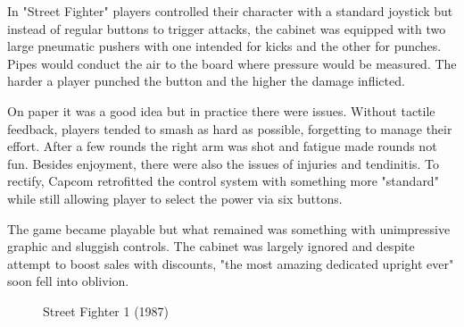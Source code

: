 In "Street Fighter" players controlled their character with a standard joystick but instead of regular buttons to trigger attacks, the cabinet was equipped with two large pneumatic pushers with one intended for kicks and the other for punches. Pipes would conduct the air to the board where pressure would be measured. The harder a player punched the button and the higher the damage inflicted.

On paper it was a good idea but in practice there were issues. Without tactile feedback, players tended to smash as hard as possible, forgetting to manage their effort. After a few rounds the right arm was shot and fatigue made rounds not fun. Besides enjoyment, there were also the issues of injuries and tendinitis. To rectify, Capcom retrofitted the control system with something more "standard" while still allowing player to select the power via six buttons. 

The game became playable but what remained was something with unimpressive graphic and sluggish controls. The cabinet was largely ignored and despite attempt to boost sales with discounts, "the most amazing dedicated upright ever" soon fell into oblivion.





\begin{figure}[H]
\caption*{Street Fighter 1 (1987)}
\end{figure}



